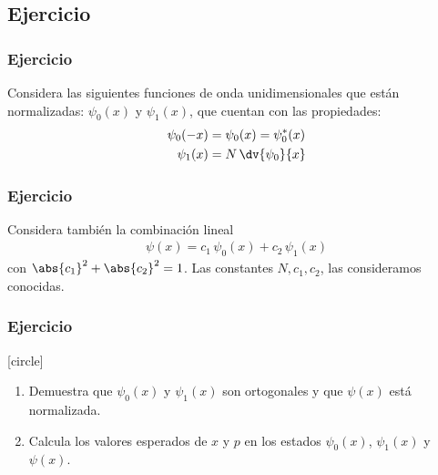 \subsection{Ejercicio}
\begin{frame}
\frametitle{Ejercicio}
Considera las siguientes funciones de onda unidimensionales que están normalizadas: $\psi_{0}(x)$ y $\psi_{1}(x)$, que cuentan con las propiedades:
\begin{align*}
\psi_{0}(-x) &= \psi_{0}(x) = \psi_{0}^{*} (x) \\
\psi_{1}(x) &= N \, \dv{\psi_{0}}{x}
\end{align*}
\end{frame}
\begin{frame}
\frametitle{Ejercicio}
Considera también la combinación lineal
\begin{align*}
\psi(x) = c_{1} \, \psi_{0}(x) + c_{2} \, \psi_{1} (x)
\end{align*}
con $\abs{c_{1}}^{2} + \abs{c_{2}}^{2} = 1$. Las constantes $N, c_{1}, c_{2}$, las consideramos conocidas.
\end{frame}
\begin{frame}
\frametitle{Ejercicio}
[circle]
\begin{enumerate}[<+->]
\item Demuestra que $\psi_{0}(x)$ y $\psi_{1}(x)$ son ortogonales y que $\psi(x)$ está normalizada.
\item Calcula los valores esperados de $x$ y $p$ en los estados $\psi_{0}(x)$, $\psi_{1}(x)$ y $\psi(x)$.
\end{enumerate}
\end{frame}
